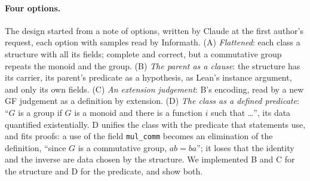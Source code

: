 \documentclass{easychair}
\newcommand{\ttt}[1]{\texttt{#1}}
\begin{document}
\paragraph{Four options.} The design started from a note of options, written by Claude at the
first author's request, each option with samples read by Informath. (A) \emph{Flattened}: each class a structure with all its fields; complete and
correct, but a commutative group repeats the monoid and the group. (B) \emph{The parent as a
clause}: the structure has its carrier, its parent's predicate as a hypothesis, as Lean's
instance argument, and only its own fields. (C) \emph{An extension judgement}: B's encoding,
read by a new GF judgement as a definition by extension. (D) \emph{The class as a defined
predicate}: ``$G$ is a group if $G$ is a monoid and there is a function $i$ such that \ldots'',
its data quantified existentially. D unifies the class with the predicate that statements
use, and fits proofs: a use of the field \ttt{mul\_comm} becomes an elimination of the
definition, ``since $G$ is a commutative group, $ab = ba$''; it loses that the identity and the
inverse are data chosen by the structure. We implemented B and C for the structure and D for
the predicate, and show both.
\end{document}
